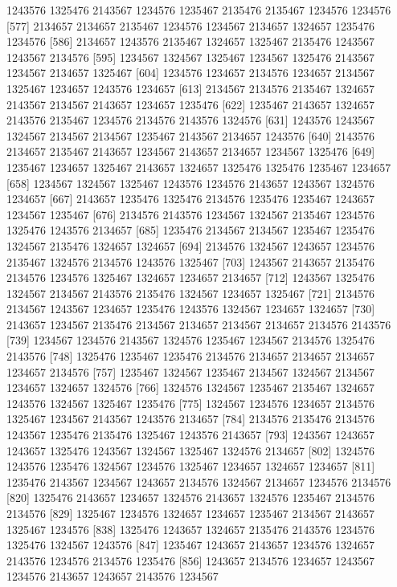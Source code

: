 \documentclass{scrartcl}
\begin{document}
\begin{Schunk}
\begin{Soutput}
 [568] 1243576 1325476 2143567 1234576 1235467 2135476 2135467 1234576 1234576
 [577] 2134657 2134657 2135467 1234576 1234567 2134657 1324657 1235476 1234576
 [586] 2134657 1243576 2135467 1324657 1325467 2135476 1243567 1243567 2134576
 [595] 1234567 1324567 1325467 1234567 1325476 2143567 1234567 2134657 1325467
 [604] 1234576 1234657 2134576 1234657 2134567 1325467 1234657 1243576 1234657
 [613] 2134567 2134576 2135467 1324657 2143567 2134567 2143657 1234657 1235476
 [622] 1235467 2143657 1324657 2143576 2135467 1234576 2134576 2143576 1324576
 [631] 1243576 1243567 1324567 2134567 2134567 1235467 2143567 2134657 1243576
 [640] 2143576 2134657 2135467 2143657 1234567 2143657 2134657 1234567 1325476
 [649] 1235467 1234657 1325467 2143657 1324657 1325476 1325476 1235467 1234657
 [658] 1234567 1324567 1325467 1243576 1234576 2143657 1243567 1324576 1234657
 [667] 2143657 1235476 1325476 2134576 1235476 1235467 1243657 1234567 1235467
 [676] 2134576 2143576 1234567 1324567 2135467 1234576 1325476 1243576 2134657
 [685] 1235476 2134567 2134567 1235467 1235476 1324567 2135476 1324657 1324657
 [694] 2134576 1324567 1243657 1234576 2135467 1324576 2134576 1243576 1325467
 [703] 1243567 2143657 2135476 2134576 1234576 1325467 1324657 1234657 2134657
 [712] 1243567 1325476 1324567 2134567 2143576 2135476 1324567 1234657 1325467
 [721] 2134576 2134567 1243567 1234657 1235476 1243576 1324567 1234657 1324657
 [730] 2143657 1234567 2135476 2134567 2134657 2134567 2134657 2134576 2143576
 [739] 1234567 1234576 2143567 1324576 1235467 1234567 2134576 1325476 2143576
 [748] 1325476 1235467 1235476 2134576 2134657 2134657 2134657 1234657 2134576
 [757] 1235467 1324567 1235467 2134567 1324567 2134567 1234657 1324657 1324576
 [766] 1324576 1324567 1235467 2135467 1324657 1243576 1324567 1325467 1235476
 [775] 1324567 1234576 1234657 2134576 1325467 1234567 2143567 1243576 2134657
 [784] 2134576 2135476 2134576 1243567 1235476 2135476 1325467 1243576 2143657
 [793] 1243567 1243657 1243657 1325476 1243567 1324567 1325467 1324576 2134657
 [802] 1324576 1243576 1235476 1324567 1234576 1325467 1234657 1324657 1234657
 [811] 1235476 2143567 1234567 1243657 2134576 1324567 2134657 1234576 2134576
 [820] 1325476 2143657 1234657 1324576 2143657 1324576 1235467 2134576 2134576
 [829] 1325467 1234576 1324657 1234657 1235467 2134567 2143657 1325467 1234576
 [838] 1325476 1243657 1324657 2135476 2143576 1234576 1325476 1324567 1243576
 [847] 1235467 1243657 2143657 1234576 1324657 2143576 1234576 2134576 1235476
 [856] 1243657 2134576 1234657 1243567 1234576 2143657 1243657 2143576 1234567

\end{Soutput}
\end{Schunk}
\end{document}
